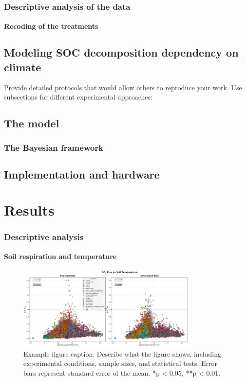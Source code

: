 \documentclass[12pt,a4paper]{article}
\begin{document}
\subsubsection{Descriptive analysis of the data}


\paragraph{Recoding of the treatments}


\subsection{Modeling SOC decomposition dependency on climate}

Provide detailed protocols that would allow others to reproduce your work. Use subsections for different experimental approaches:




\subsection{The model}

\subsubsection{The Bayesian framework}

\subsection{Implementation and hardware}




\section{Results}

\subsubsection{Descriptive analysis}

\paragraph{Soil respiration and temperature}
\begin{figure}[H]
    \centering
    \includegraphics[width=0.8\textwidth]{"../co2_flux_temperature_comparison.png"}
    \caption{Example figure caption. Describe what the figure shows, including experimental conditions, sample sizes, and statistical tests. Error bars represent standard error of the mean. *p < 0.05, **p < 0.01.}
    \label{fig:example}
\end{figure}
\end{document}
